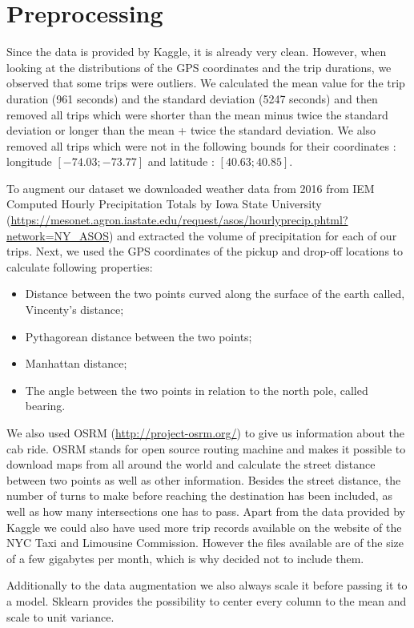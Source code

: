 \documentclass[a4paper]{article}
\begin{document}
\section{Preprocessing}
Since the data is provided by Kaggle, it is already very clean. However, when
looking at the distributions of the GPS coordinates and the trip durations, we
observed that some trips were outliers. We calculated the mean value for the
trip duration (961 seconds) and the standard deviation (5247 seconds) and then
removed all trips which were shorter than the mean minus twice the standard
deviation or longer than the mean + twice the standard deviation. We also
removed all trips which were not in the following bounds for their coordinates :
longitude $[-74.03;-73.77]$ and latitude : $[40.63;40.85]$.

To augment our  dataset  we downloaded weather data from 2016 from IEM Computed
Hourly Precipitation Totals by Iowa State University
(\url{https://mesonet.agron.iastate.edu/request/asos/hourlyprecip.phtml?network=NY_ASOS})
and extracted the volume of precipitation for each of our trips. Next, we used
the GPS coordinates of the pickup and drop-off locations to calculate following
properties:
\begin{itemize}
    \item Distance between the two points curved along the surface of the
earth called, Vincenty's distance;
    \item Pythagorean distance between the two points;
    \item Manhattan distance;
    \item The angle between the two points in relation to the north pole, called bearing.
\end{itemize}
We also used OSRM (\url{http://project-osrm.org/}) to give us information
about the cab ride. OSRM stands for open source routing machine and makes it
possible to download maps from all around the world and calculate the street
distance between two points as well as other information. Besides the street
distance, the number of turns to make before reaching the
destination has been included, as well as how many intersections one has to pass.  Apart from the data
provided by Kaggle we could also have used more trip records available on the
website of the NYC Taxi and Limousine Commission. However the files available
are of the size of a few gigabytes per month, which is why decided not to
include them.

Additionally to the data augmentation we also always scale it before passing it to a model. Sklearn provides the possibility to center every column to the mean and scale to unit variance.
\end{document}

